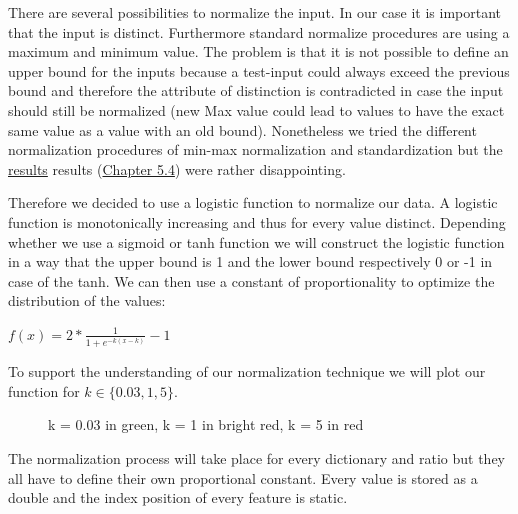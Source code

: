 \documentclass[paper=A4,pagesize=auto,12pt,headinclude=true,footinclude=true,BCOR=0mm,DIV=calc]{scrartcl}
\begin{document}
	There are several possibilities to normalize the input. In our case it is important that the input is distinct. Furthermore standard normalize procedures are using a maximum and minimum value. The problem is that it is not possible to define an upper bound for the inputs because a test-input could always exceed the previous bound and therefore the attribute of distinction is contradicted in case the input should still be normalized (new Max value could lead to values to have the exact same value as a value with an old bound). Nonetheless we tried the different normalization procedures of min-max normalization and standardization but the \hyperref[src:optimizing]{results} results (\hyperref[src:optimizing]{Chapter 5.4}) were rather disappointing.
	
	
	Therefore we decided to use a logistic function to normalize our data. A logistic function is monotonically increasing and thus for every value distinct. Depending whether we use a sigmoid or tanh function we will construct the logistic function in a way that the upper bound is 1 and the lower bound respectively 0 or -1 in case of the tanh. 
	We can then use a constant of proportionality to optimize the distribution of the values:
	
	$f(x) = 2 * \frac{1}{1 + e^{-k(x-k)}} -1$
	
	To support the understanding of our normalization technique we will plot our function for $k \in \{0.03, 1, 5\}$.\\
	\begin{figure}[H]
		\caption{k = 0.03 in green, k = 1 in bright red, k = 5 in red}
	\end{figure}
	
	The normalization process will take place for every dictionary and ratio but they all have to define their own proportional constant.
	Every value is stored as a double and the index position of every feature is static.
	
\end{document}
